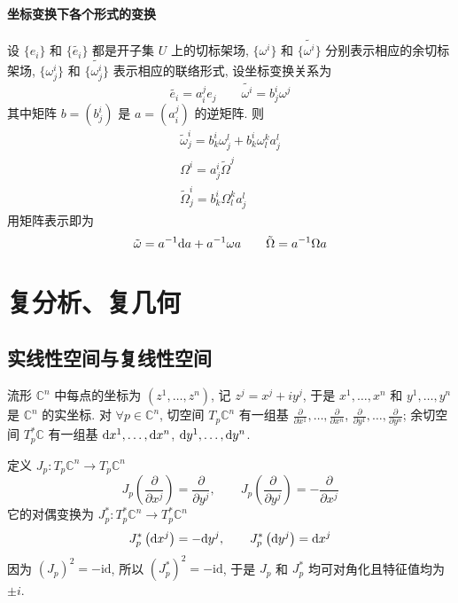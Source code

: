 \documentclass{book}
\newcommand{\md}{{\rm d}}
\newcommand{\pd}[2]{\frac{\partial #1}{\partial #2}}
\begin{document}
        \subsubsection{坐标变换下各个形式的变换}
            设 $\{e_i\}$ 和 $\{\tilde{e_i}\}$ 都是开子集 $U$ 上的切标架场, $\{\omega^i\}$ 和 $\{\tilde{\omega^i}\}$ 分别表示相应的余切标架场,
            $\{\omega^i_j\}$ 和 $\{\tilde{\omega^i_j}\}$ 表示相应的联络形式, 设坐标变换关系为
            \begin{equation*}
                \tilde{e_i} = a^j_ie_j\qquad \tilde{\omega^i} = b^i_j\omega^j
            \end{equation*}
            其中矩阵 $b = (b^i_j)$ 是 $a = (a^j_i)$ 的逆矩阵.
            则
            \begin{gather*}
                \tilde{\omega}^i_j = b^i_k\omega^l_j+b^i_k\omega^k_la^l_j \\
                \Omega^i = a^i_j\tilde{\Omega}^j \\
                \tilde{\Omega}^i_j = b^i_k\Omega^k_la^l_j
            \end{gather*}
            用矩阵表示即为
            \begin{equation*}
                \tilde{\omega} = a^{-1}\md a + a^{-1}\omega a \qquad \tilde{\Omega} = a^{-1}\Omega a
            \end{equation*}

    \chapter{复分析、复几何}
    \section{实线性空间与复线性空间}
        流形 $\mathbb{C}^n$ 中每点的坐标为 $(z^1,\dots,z^n)$, 记 $z^j=x^j+iy^j$, 于是 $x^1,\dots,x^n$ 和 $y^1,\dots,y^n$ 是 $\mathbb{C}^n$ 的实坐标.
        对 $\forall p\in\mathbb{C}^n$, 切空间 $T_p\mathbb{C}^n$ 有一组基 $\pd{}{x^1},\dots,\pd{}{x^n}$, $\pd{}{y^1},\dots,\pd{}{y^n}$; 余切空间 $T^*_p\mathbb{C}$
        有一组基 $\md x^1,\dots,\md x^n$, $\md y^1,\dots,\md y^n$.

        定义 $J_p:T_p\mathbb{C}^n\rightarrow T_p\mathbb{C}^n$
        \begin{equation*}
            J_p\left(\pd{}{x^j}\right)=\pd{}{y^j},\qquad J_p\left(\pd{}{y^j}\right)=-\pd{}{x^j}
        \end{equation*}
        它的对偶变换为 $J^*_p:T^*_p\mathbb{C}^n\rightarrow T^*_p\mathbb{C}^n$
        \begin{equation*}
            J^*_p\left(\md x^j\right)=-\md{y^j},\qquad J^*_p\left(\md{y^j}\right)=\md{x^j}
        \end{equation*}
        因为 $(J_p)^2=-\mathrm{id}$, 所以 $(J^*_p)^2=-\mathrm{id}$, 于是 $J_p$ 和 $J^*_p$ 均可对角化且特征值均为 $\pm i$.
\end{document}
